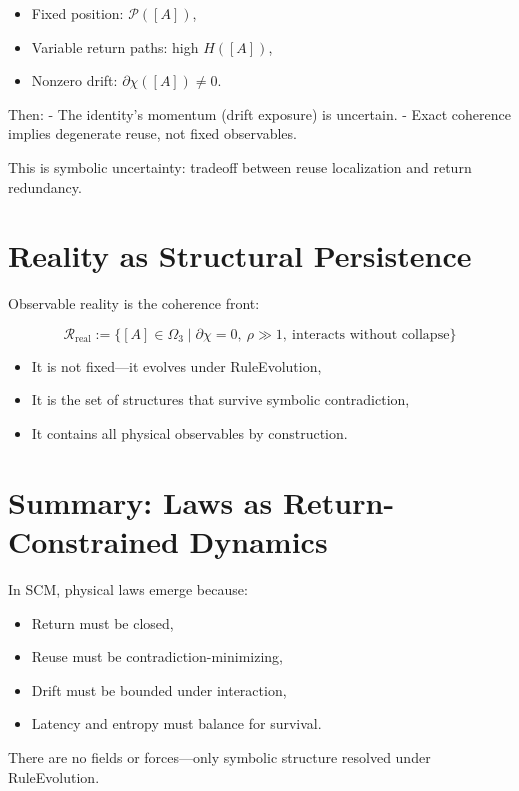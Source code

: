 \begin{itemize}
  \item Fixed position: $\mathcal{P}([A])$,
  \item Variable return paths: high $H([A])$,
  \item Nonzero drift: $\partial\chi([A]) \ne 0$.
\end{itemize}

Then:
- The identity’s momentum (drift exposure) is uncertain.
- Exact coherence implies degenerate reuse, not fixed observables.

This is symbolic uncertainty: tradeoff between reuse localization and return redundancy.

\section{Reality as Structural Persistence} \label{sec:reality}

Observable reality is the coherence front:

\[
\mathcal{R}_{\text{real}} := \{ [A] \in \Omega_3 \mid \partial\chi = 0,\ \rho \gg 1,\ \text{interacts without collapse} \}
\]

\begin{itemize}
  \item It is not fixed—it evolves under RuleEvolution,
  \item It is the set of structures that survive symbolic contradiction,
  \item It contains all physical observables by construction.
\end{itemize}

\section{Summary: Laws as Return-Constrained Dynamics} \label{sec:summary-laws}

In SCM, physical laws emerge because:

\begin{itemize}
  \item Return must be closed,
  \item Reuse must be contradiction-minimizing,
  \item Drift must be bounded under interaction,
  \item Latency and entropy must balance for survival.
\end{itemize}

There are no fields or forces—only symbolic structure resolved under RuleEvolution.

